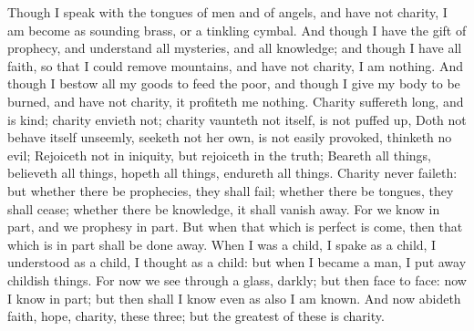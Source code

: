 \clearpage
{}
 Though I speak with the tongues of men and of angels, and have not charity, I am become as sounding brass, or a tinkling cymbal. And though I have the gift of prophecy, and understand all mysteries, and all knowledge; and though I have all faith, so that I could remove mountains, and have not charity, I am nothing. And though I bestow all my goods to feed the poor, and though I give my body to be burned, and have not charity, it profiteth me nothing. Charity suffereth long, and is kind; charity envieth not; charity vaunteth not itself, is not puffed up, Doth not behave itself unseemly, seeketh not her own, is not easily provoked, thinketh no evil; Rejoiceth not in iniquity, but rejoiceth in the truth; Beareth all things, believeth all things, hopeth all things, endureth all things. Charity never faileth: but whether there be prophecies, they shall fail; whether there be tongues, they shall cease; whether there be knowledge, it shall vanish away. For we know in part, and we prophesy in part. But when that which is perfect is come, then that which is in part shall be done away. When I was a child, I spake as a child, I understood as a child, I thought as a child: but when I became a man, I put away childish things. For now we see through a glass, darkly; but then face to face: now I know in part; but then shall I know even as also I am known. And now abideth faith, hope, charity, these three; but the greatest of these is charity.


